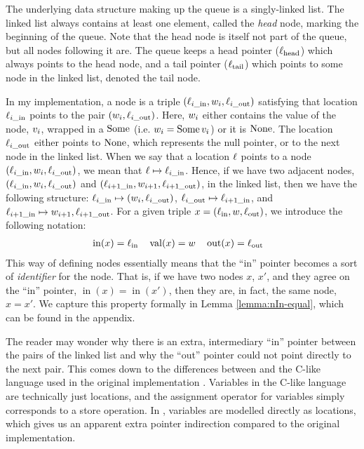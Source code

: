 \documentclass[a4paper, 10pt]{report}
\theoremstyle{definition}
\newcommand{\locin}{\loc_{\mathrm{in}}}
\newcommand{\locinM}[1]{\loc_{#1\_\mathrm{in}}}
\newcommand{\locout}{\loc_{\mathrm{out}}}
\newcommand{\locoutM}[1]{\loc_{#1\_\mathrm{out}}}
\newcommand{\locN}[1]{\loc_{\mathrm{#1}}}
\newcommand{\lochead}{\locN{head}}
\newcommand{\loctail}{\locN{tail}}
\newcommand{\nodeval}{\valB}
\newcommand{\nodevalM}[1]{\nodeval_{#1}}
\newcommand{\nIn}[1]{\operatorname{in}(#1)}
\newcommand{\nVal}[1]{\operatorname{val}(#1)}
\newcommand{\nOut}[1]{\operatorname{out}(#1)}
\newcommand{\node}{x}
\newcommand{\absvalue}{\val}
\begin{document}
The underlying data structure making up the queue is a singly-linked list. The linked list always contains at least one element, called the \emph{head} node, marking the beginning of the queue. Note that the head node is itself not part of the queue, but all nodes following it are. The queue keeps a head pointer ($\lochead$) which always points to the head node, and a tail pointer ($\loctail$) which points to some node in the linked list, denoted the tail node.

In my implementation, a node is a triple $(\locinM{i}, \nodevalM{i}, \locoutM{i})$ satisfying that location $\locinM{i}$ points to the pair $(\nodevalM{i}, \locoutM{i})$. Here, $\nodevalM{i}$ either contains the value of the node, $\absvalue_i$, wrapped in a $\operatorname{Some}$ (i.e. $\nodevalM{i} = \Some \absvalue_i$) or it is $\operatorname{None}$. The location $\locoutM{i}$ either points to $\operatorname{None}$, which represents the null pointer, or to the next node in the linked list. When we say that a location $\ell$ points to a node $(\locinM{i}, \nodevalM{i}, \locoutM{i})$, we mean that $\loc \mapsto \locinM{i}$. Hence, if we have two adjacent nodes, $(\locinM{i}, \nodevalM{i}, \locoutM{i})$ and $(\locinM{i+1}, \nodevalM{i+1}, \locoutM{i+1})$, in the linked list, then we have the following structure: $\locinM{i} \mapsto (\nodevalM{i}, \locoutM{i})$, $\locoutM{i} \mapsto \locinM{i+1}$, and $\locinM{i+1} \mapsto \nodevalM{i+1}, \locoutM{i+1}$.
For a given triple $\node = (\locin, \nodeval, \locout)$, we introduce the following notation:
\begin{align*}
  &\nIn{\node} = \locin& &\nVal{\node} = \nodeval& &\nOut{\node} = \locout
\end{align*}
This way of defining nodes essentially means that the ``in'' pointer becomes a sort of \textit{identifier} for the node. That is, if we have two nodes $\node$, $\node'$, and they agree on the ``in'' pointer, $\nIn{\node} = \nIn{\node'}$, then they are, in fact, the same node, $\node = \node'$. We capture this property formally in Lemma \ref{lemma:nIn-equal}, which can be found in the appendix.

The reader may wonder why there is an extra, intermediary ``in'' pointer between the pairs of the linked list and why the ``out'' pointer could not point directly to the next pair. This comes down to the differences between \heaplang and the C-like language used in the original implementation \citep{DBLP:conf/podc/MichaelS96}. Variables in the C-like language are technically just locations, and the assignment operator for variables simply corresponds to a store operation. In \heaplang, variables are modelled directly as locations, which gives us an apparent extra pointer indirection compared to the original implementation.
\end{document}

